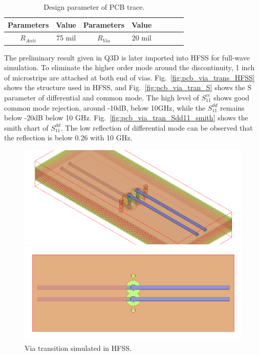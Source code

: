 \documentclass{book}  %
\begin{document}
\begin{paper}
\begin{table}[htbp!]
	\renewcommand{\arraystretch}{1.3}	
	\begin{center}
		\begin{tabular}{| c | c | c | c | c | c | c | c |}
			\hline
			Parameters  & Value  & Parameters & Value  \\ \hline
			$R_{Anti}$  & 75 mil & $R_{Via}$  & 20 mil \\
			\hline
		\end{tabular}
	\end{center}
	\label{table:pcb_via_tran}
	\caption{Design parameter of PCB trace.}
\end{table}
%
The preliminary result given in Q3D is later imported into HFSS for full-wave simulation. To eliminate the higher order mode around the discontinuity,  1 inch of microstrips are attached at both end of vias. Fig.~\ref{fig:pcb_via_trans_HFSS} shows the structure used in HFSS, and Fig.~\ref{fig:pcb_via_tran_S} shows the S parameter of differential and common mode. The high level of $S^{cc}_{11}$ shows good common mode rejection, around -10dB, below 10GHz, while the $S^{dd}_{11}$ remains below -20dB below 10 GHz. Fig.~\ref{fig:pcb_via_tran_Sdd11_smith} shows the smith chart of $S^{dd}_{11}$. The low reflection of differential mode can be observed that the reflection is below 0.26 with 10 GHz.

\begin{figure}[htbp!]
	\centering	
	\begin{minipage}[b]{0.5\linewidth}
		\includegraphics[width=\textwidth]{./img/PCB/Via_Transition/View_45_Degree.png}
	\end{minipage}%
	\begin{minipage}[b]{0.5\linewidth}
		\includegraphics[width=\textwidth]{./img/PCB/Via_Transition/View_Top.png}
	\end{minipage}
	\caption{Via transition simulated in HFSS.}
\end{figure}


\end{paper}
\end{document}
